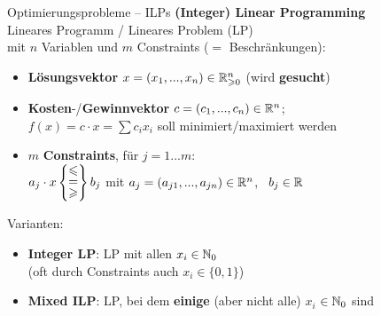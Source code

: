 \begin{frame}{Optimierungsprobleme – ILPs}
	\textbf{(Integer) Linear Programming} \\
	Lineares Programm / Lineares Problem (LP) \\ mit $n$ Variablen und $m$ Constraints ($=$ Beschränkungen):   %
	\begin{itemize}
		\pause
		\item \textbf{Lösungsvektor} $x = (x_1, ..., x_n) \in \mathbb{R}_{\geqslant0}^n$ (wird \textbf{gesucht})
		\pause
		\item \textbf{Kosten}-/\textbf{Gewinnvektor} $c = (c_1, ..., c_n)\in \mathbb{R}^n$; \\ 
		$f(x) = c \cdot x = \sum c_i  x_i $ soll minimiert/maximiert werden
		\pause
		\item $m$ \textbf{Constraints}, \quad für $j = 1...m$: \\ \vspace{.1\baselineskip}
		\quad $a_j \cdot x \braced{\stackedtight{\leq \\ = \\ \geq}} b_j$ \quad mit $a_j = (a_{j1}, ..., a_{jn}) \in \mathbb{R}^n$, \ $b_j \in \mathbb{R}$  %
	\end{itemize}
	\pause
	Varianten:
	\begin{itemize}
		\item \textbf{Integer LP}: LP mit allen $x_i \in \mathbb{N}_0$ \\
		(oft durch Constraints auch $x_i \in \{0, 1\}$)
		\pause
		\item \textbf{Mixed ILP}: LP, bei dem \textbf{einige} (aber nicht alle) $x_i$ $\in \mathbb{N}_0$ sind
	\end{itemize}
\end{frame}

